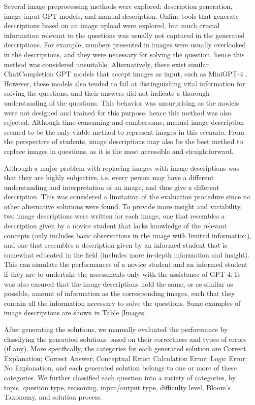 \documentclass[sigconf,authordraft]{acmart}
\begin{document}
Several image preprocessing methods were explored: description generation, image-input GPT models, and manual description. Online tools that generate descriptions based on an image upload were explored, but much crucial information relevant to the questions was usually not captured in the generated descriptions. For example, numbers presented in images were usually overlooked in the descriptions, and they were necessary for solving the question, hence this method was considered unsuitable. Alternatively, there exist similar ChatCompletion GPT models that accept images as input, such as MiniGPT-4 \cite{mini}. However, these models also tended to fail at distinguishing vital information for solving the questions, and their answers did not indicate a thorough understanding of the questions. This behavior was unsurprising as the models were not designed and trained for this purpose, hence this method was also rejected. Although time-consuming and cumbersome, manual image description seemed to be the only viable method to represent images in this scenario. From the perspective of students, image descriptions may also be the best method to replace images in questions, as it is the most accessible and straightforward.

\label{imageslimitation}
Although a major problem with replacing images with image descriptions was that they are highly subjective, i.e. every person may have a different understanding and interpretation of an image, and thus give a different description. This was considered a limitation of the evaluation procedure since no other alternative solutions were found. To provide more insight and variability, two image descriptions were written for each image, one that resembles a description given by a novice student that lacks knowledge of the relevant concepts (only includes basic observations in the image with limited information), and one that resembles a description given by an informed student that is somewhat educated in the field (includes more in-depth information and insight). This can simulate the performances of a novice student and an informed student if they are to undertake the assessments only with the assistance of GPT-4. It was also ensured that the image descriptions hold the same, or as similar as possible, amount of information as the corresponding images, such that they contain all the information necessary to solve the questions. Some examples of image descriptions are shown in Table \ref{Images}.

After generating the solutions, we manually evaluated the performance by classifying the generated solutions based on their correctness and types of errors (if any). More specifically, the categories for each generated solution are Correct Explanation; Correct Answer; Conceptual Error; Calculation Error; Logic Error; No Explanation, and each generated solution belongs to one or more of these categories. We further classified each question into a variety of categories, by topic, question type, reasoning, input/output type, difficulty level, Bloom's Taxonomy, and solution process.
\end{document}
